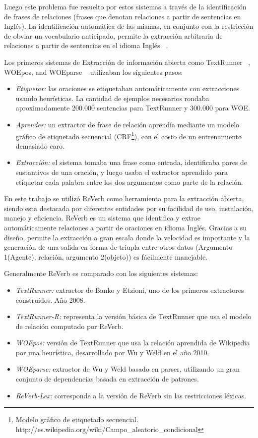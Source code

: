 Luego este problema fue resuelto por estos sistemas a trav\'es de la identificaci\'on de frases de relaciones (frases que denotan relaciones a partir de sentencias en Ingl\'es). La identificaci\'on autom\'atica de las mismas,	 en conjunto con la restricci\'on de obviar un vocabulario anticipado, permite la extracci\'on arbitraria  de relaciones a partir de sentencias en el idioma Ingl\'es
~\cite{BanCafSodBroEtz:07}.

Los primeros sistemas de Extracci\'on de informaci\'on abierta como TextRunner ~\cite{EtBaSoWe:12}, WOEpos, and WOEparse ~\cite{WuWe:10} utilizaban los siguientes pasos:
\begin{itemize}
\item	\emph{Etiquetar:} las oraciones se etiquetaban autom\'aticamente con extracciones usando heur\'isticas. La cantidad de ejemplos necesarios rondaba aproximadamente 200.000 sentencias para TextRunner y 300.000 para WOE.
\item	\emph{Aprender:} un extractor de frase de relaci\'on aprend\'ia mediante un modelo gr\'afico de etiquetado secuencial (CRF\footnote{Modelo gr\'afico de etiquetado secuencial. \\ http://es.wikipedia.org/wiki/Campo\_aleatorio\_condicional}), con el costo de un entrenamiento demasiado caro.
\item	\emph{Extracci\'on:} el sistema tomaba una frase como entrada, identificaba pares de sustantivos de una oraci\'on, y luego usaba el extractor aprendido para etiquetar cada palabra entre los dos argumentos como parte de la relaci\'on.
\end{itemize}

En este trabajo se utiliz\'o ReVerb como herramienta para la extracci\'on abierta, siendo esta destacada por diferentes entidades por su facilidad de uso, instalaci\'on, manejo y eficiencia.
ReVerb es un sistema que identifica y extrae autom\'aticamente relaciones a partir de oraciones en idioma Ingl\'es. Gracias a su dise\~no, permite la extracci\'on a gran escala donde la velocidad es importante y la generaci\'on de una salida en forma de triupla entre otros datos (Argumento 1(Agente), relaci\'on, argumento 2(objeto)) es f\'acilmente manejable.

Generalmente ReVerb es comparado con los siguientes sistemas:
\begin{itemize}
\item	\emph{TextRunner:} extractor de Banko y Etzioni, uno de los primeros extractores construidos. A\~no 2008.
\item	\emph{TextRunner-R:} representa la versi\'on b\'asica de TextRunner que usa el modelo de relaci\'on computado por ReVerb.
\item	\emph{WOEpos:} versi\'on de TextRunner que usa la relaci\'on aprendida de Wikipedia por una heur\'istica, desarrollado por Wu y Weld en el a\~no 2010.
\item	\emph{WOEparse:} extractor de Wu y Weld basado en parser, utilizando un gran conjunto de dependencias basada en extracci\'on de patrones.
\item	\emph{ReVerb-Lex:} corresponde a la versi\'on de ReVerb sin las restricciones l\'exicas.
\end{itemize}

